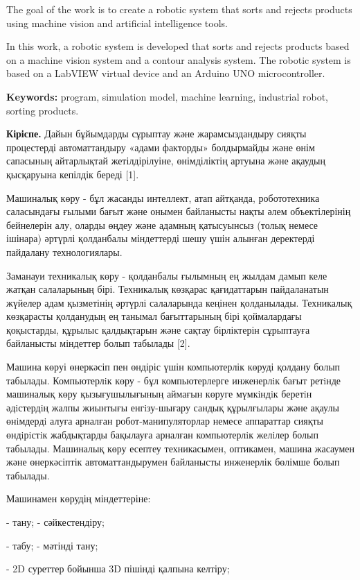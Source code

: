 The goal of the work is to create a robotic system that sorts and
rejects products using machine vision and artificial intelligence tools.

In this work, a robotic system is developed that sorts and rejects
products based on a machine vision system and a contour analysis system.
The robotic system is based on a LabVIEW virtual device and an Arduino
UNO microcontroller.

{\bfseries Keywords:} program, simulation model, machine learning,
industrial robot, sorting products.

\begin{multicols}{2}
{\bfseries Кіріспе.} Дайын бұйымдарды сұрыптау және жарамсыздандыру сияқты
процестерді автоматтандыру «адами факторды» болдырмайды және өнім
сапасының айтарлықтай жетілдірілуіне, өнімділіктің артуына және ақаудың
қысқаруына кепілдік береді {[}1{]}.

Машиналық көру - бұл жасанды интеллект, атап айтқанда, робототехника
саласындағы ғылыми бағыт және онымен байланысты нақты әлем
объектілерінің бейнелерін алу, оларды өңдеу және адамның қатысуынсыз
(толық немесе ішінара) әртүрлі қолданбалы міндеттерді шешу үшін алынған
деректерді пайдалану технологиялары.

Заманауи техникалық көру - қолданбалы ғылымның ең жылдам дамып келе
жатқан салаларының бірі. Техникалық көзқарас қағидаттарын пайдаланатын
жүйелер адам қызметінің әртүрлі салаларында кеңінен қолданылады.
Техникалық көзқарасты қолданудың ең танымал бағыттарының бірі
қоймалардағы қоқыстарды, құрылыс қалдықтарын және сақтау бірліктерін
сұрыптауға байланысты міндеттер болып табылады {[}2{]}.

Машина көруі өнеркәсіп пен өндіріс үшін компьютерлік көруді қолдану
болып табылады. Компьютерлiк көру - бұл компьютерлерге инженерлiк бағыт
ретiнде машиналық көру қызығушылығының аймағын көруге мүмкiндiк беретiн
әдiстердiң жалпы жиынтығы енгiзу-шығару сандық құрылғылары және ақаулы
өнiмдердi алуға арналған робот-манипуляторлар немесе аппараттар сияқты
өндiрiстiк жабдықтарды бақылауға арналған компьютерлiк желiлер болып
табылады. Машиналық көру есептеу техникасымен, оптикамен, машина
жасаумен және өнеркәсіптік автоматтандырумен байланысты инженерлік
бөлімше болып табылады.

Машинамен көрудің міндеттеріне:

- тану; - сәйкестендіру;

- табу; - мәтінді тану;

- 2D суреттер бойынша 3D пішінді қалпына келтіру;


\end{multicols}
